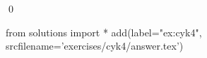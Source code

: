 
\begin{ex} 
  \label{ex:cyk4}
  
  \qed
\end{ex} 
\begin{python0}
from solutions import *
add(label="ex:cyk4",
    srcfilename='exercises/cyk4/answer.tex') 
\end{python0}
